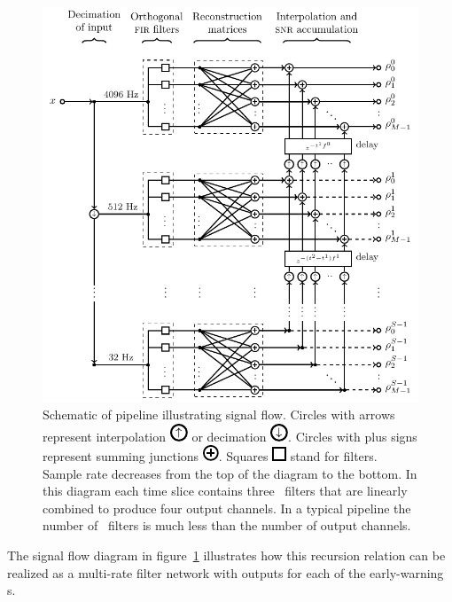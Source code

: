 \begin{figure}[h!]
	\begin{center}
		\includegraphics{figures/lloid-diagram.pdf}
		\caption{\label{fig:pipeline} Schematic of \lloid{} pipeline illustrating
signal flow.  Circles with arrows represent interpolation
\protect\includegraphics{figures/upsample-symbol.pdf} or decimation
\protect\includegraphics{figures/downsample-symbol.pdf}.  Circles with plus
signs represent summing junctions
\protect\includegraphics{figures/adder-symbol.pdf}.  Squares
\protect\includegraphics{figures/fir-symbol.pdf} stand for \fir{} filters.  Sample
rate decreases from the top of the diagram to the bottom.  In this diagram each
time slice contains three \fir\ filters that are linearly combined to produce
four output channels.  In a typical pipeline the number of \fir\ filters is
much less than the number of output channels.}
	\end{center}
\end{figure}
%
%
The signal flow diagram in figure~\ref{fig:pipeline} illustrates how this
recursion relation can be realized as a multi-rate filter network with outputs for
each of the early-warning \SNR{}s.

